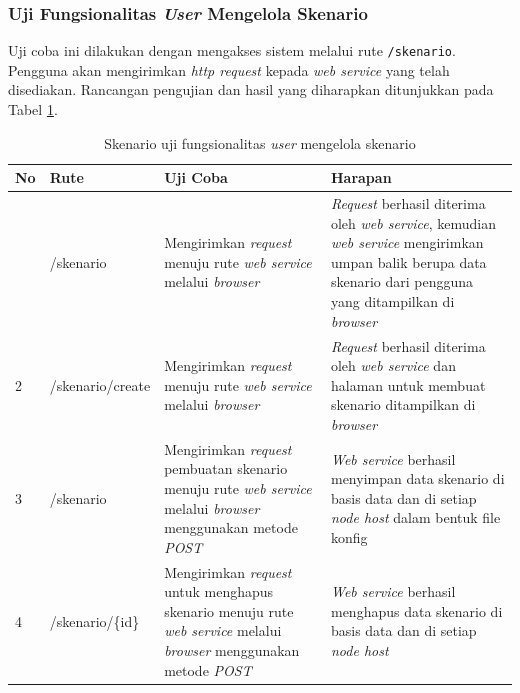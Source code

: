 		\subsubsection{Uji Fungsionalitas \textit{User} Mengelola Skenario}
			Uji coba ini dilakukan dengan mengakses sistem melalui rute \texttt{/skenario}. Pengguna akan mengirimkan \textit{http request} kepada \textit{web service} yang telah disediakan. Rancangan pengujian dan hasil yang diharapkan ditunjukkan pada Tabel \ref{tabelujiskenario}.
			\begin{longtable}{|p{}|p{}|p{0.30\textwidth}|p{}|}
				\caption{Skenario uji fungsionalitas \textit{user} mengelola skenario} \label{tabelujiskenario} \\ \hline
				\textbf{No} & \textbf{Rute} & \textbf{Uji Coba} & \textbf{Harapan} \\ \hline
				\endhead
				\endfoot
				\endlastfoot
				1 & /skenario & Mengirimkan \textit{request} menuju rute \textit{web service} melalui \textit{browser} & \textit{Request} berhasil diterima oleh \textit{web service}, kemudian \textit{web service} mengirimkan umpan balik berupa data skenario dari pengguna yang ditampilkan di \textit{browser} \\ \hline
				2 & /skenario/create & Mengirimkan \textit{request} menuju rute \textit{web service} melalui \textit{browser} & \textit{Request} berhasil diterima oleh \textit{web service} dan halaman untuk membuat skenario ditampilkan di \textit{browser} \\ \hline
				3 & /skenario & Mengirimkan \textit{request} pembuatan skenario menuju rute \textit{web service} melalui \textit{browser} menggunakan metode \textit{POST} & \textit{Web service} berhasil menyimpan data skenario di basis data dan di setiap \textit{node host} dalam bentuk file konfig \\ \hline
				4 & /skenario/\{id\} & Mengirimkan \textit{request} untuk menghapus skenario menuju rute \textit{web service} melalui \textit{browser} menggunakan metode \textit{POST} & \textit{Web service} berhasil menghapus data skenario di basis data dan di setiap \textit{node host} \\ \hline
			\end{longtable}
		

